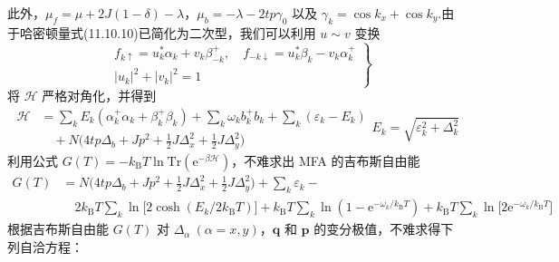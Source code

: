 此外，$\mu_{f}=\mu+2J(1-\delta)-\lambda$，$\mu_{b}=-\lambda-2tp\gamma_{0}$ 以及 $\gamma_{k}=\cos k_{x}+\cos k_{y}$.由于哈密顿量式(11.10.10)已简化为二次型，我们可以利用 $u\sim v$ 变换
\begin{equation}
\left.\begin{aligned}
  &f_{k\uparrow}=u_{k}^{*}\alpha_{k}+v_{k}\beta_{-k}^{+},\quad
   f_{-k\downarrow}=u_{k}^{*}\beta_{k}-v_{k}\alpha_{k}^{+}\\
  &|u_{k}|^{2}+|v_{k}|^{2}=1
\end{aligned}\right\}
\end{equation}
将 $\mathscr{H}$ 严格对角化，并得到
\begin{subequations}
\begin{equation}
\begin{aligned}
  \mathscr{H}&=\sum_{k}E_{k}(\alpha_{k}^{+}\alpha_{k}+\beta_{k}^{+}\beta_{k})
  +\sum_{k}\omega_{k}b_{k}^{+}b_{k}+\sum_{k}(\varepsilon_{k}-E_{k})\\
  &\quad+N\biggl(4tp\Delta_{b}+Jp^{2}+\frac{1}{2}J\Delta_{x}^{2}+\frac{1}{2}J\Delta_{y}^{2}\biggr)
\end{aligned}
\end{equation}
\begin{equation}
  E_{k}=\sqrt{\varepsilon_{k}^{2}+\Delta_{k}^{2}}
\end{equation}
\end{subequations}
利用公式 $G(T)=-k_{\mathrm{B}}T\ln\mathrm{Tr}(\mathrm{e}^{-\beta\mathscr{H}})$，不难求出 MFA 的吉布斯自由能
\begin{equation}
\begin{aligned}
  G(T)&=N\biggl(4tp\Delta_{b}+Jp^{2}+\frac{1}{2}J\Delta_{x}^{2}+\frac{1}{2}J\Delta_{y}^{2}\biggr)
  +\sum_{k}\varepsilon_{k}-\\
  &\quad 2k_{\mathrm{B}}T\sum_{k}\ln\bigl[2\cosh(E_{k}/2k_{\mathrm{B}}T)\bigr]
  +k_{\mathrm{B}}T\sum_{k}\ln(1-\mathrm{e}^{-\omega_{k}/k_{\mathrm{B}}T})
  +k_{\mathrm{B}}T\sum_{k}\ln\bigl[2\mathrm{e}^{-\omega_{k}/k_{\mathrm{B}}T}\bigr]
\end{aligned}
\end{equation}
根据吉布斯自由能 $G(T)$ 对 $\Delta_{\alpha}\ (\alpha=x,y)$，$\boldsymbol{q}$ 和 $\boldsymbol{p}$ 的变分极值，不难求得下列自洽方程：

